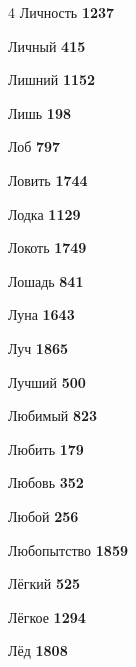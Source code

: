 \begin{multicols}{4}
\noindent Личность \dotfill \textbf{\color{secondary} 1237}\par
\noindent Личный \dotfill \textbf{\color{secondary} 415}\par
\noindent Лишний \dotfill \textbf{\color{secondary} 1152}\par
\noindent Лишь \dotfill \textbf{\color{secondary} 198}\par
\noindent Лоб \dotfill \textbf{\color{secondary} 797}\par
\noindent Ловить \dotfill \textbf{\color{secondary} 1744}\par
\noindent Лодка \dotfill \textbf{\color{secondary} 1129}\par
\noindent Локоть \dotfill \textbf{\color{secondary} 1749}\par
\noindent Лошадь \dotfill \textbf{\color{secondary} 841}\par
\noindent Луна \dotfill \textbf{\color{secondary} 1643}\par
\noindent Луч \dotfill \textbf{\color{secondary} 1865}\par
\noindent Лучший \dotfill \textbf{\color{secondary} 500}\par
\noindent Любимый \dotfill \textbf{\color{secondary} 823}\par
\noindent Любить \dotfill \textbf{\color{secondary} 179}\par
\noindent Любовь \dotfill \textbf{\color{secondary} 352}\par
\noindent Любой \dotfill \textbf{\color{secondary} 256}\par
\noindent Любопытство \dotfill \textbf{\color{secondary} 1859}\par
\noindent Лёгкий \dotfill \textbf{\color{secondary} 525}\par
\noindent Лёгкое \dotfill \textbf{\color{secondary} 1294}\par
\noindent Лёд \dotfill \textbf{\color{secondary} 1808}\par


\end{multicols}
